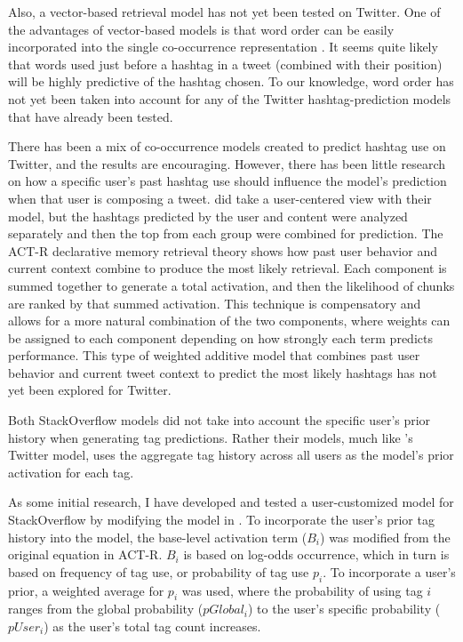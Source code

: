 \documentclass[man,floatsintext,donotrepeattitle]{apa6}
\begin{document}
Also, a vector-based retrieval model has not yet been tested on Twitter.
One of the advantages of vector-based models is that word order can be easily incorporated into the single co-occurrence representation \parencite{Jones2007}.
It seems quite likely that words used just before a hashtag in a tweet (combined with their position) will be highly predictive of the hashtag chosen.
To our knowledge, word order has not yet been taken into account for any of the Twitter hashtag-prediction models that have already been tested.

There has been a mix of co-occurrence models created to predict hashtag use on Twitter, and the results are encouraging.
However, there has been little research on how a specific user's past hashtag use should influence the model's prediction when that user is composing a tweet.
\textcite{Kywe2012} did take a user-centered view with their model, but the hashtags predicted by the user and content were analyzed separately and then the top from each group were combined for prediction.
The ACT-R declarative memory retrieval theory shows how past user behavior and current context combine to produce the most likely retrieval.
Each component is summed together to generate a total activation, and then the likelihood of chunks are ranked by that summed activation.
This technique is compensatory and allows for a more natural combination of the two components, where weights can be assigned to each component depending on how strongly each term predicts performance.
This type of weighted additive model that combines past user behavior and current tweet context to predict the most likely hashtags has not yet been explored for Twitter.

Both StackOverflow models \parencites{Stanley2013,Kuo2011} did not take into account the specific user's prior history when generating tag predictions.
Rather their models, much like \textcite{Mazzia2009}'s Twitter model, uses the aggregate tag history across all users as the model's prior activation for each tag.

As some initial research, I have developed and tested a user-customized model for StackOverflow by modifying the model in \textcite{Stanley2013}.
To incorporate the user's prior tag history into the model, the base-level activation term ($B_{i}$) was modified from the original equation in ACT-R.
$B_{i}$ is based on log-odds occurrence, which in turn is based on frequency of tag use, or probability of tag use $p_{i}$.
To incorporate a user's prior, a weighted average for $p_{i}$ was used,
where the probability of using tag $i$ ranges from the global probability ($pGlobal_{i}$) to the user's specific probability ($pUser_{i}$) as the user's total tag count increases.
\end{document}
